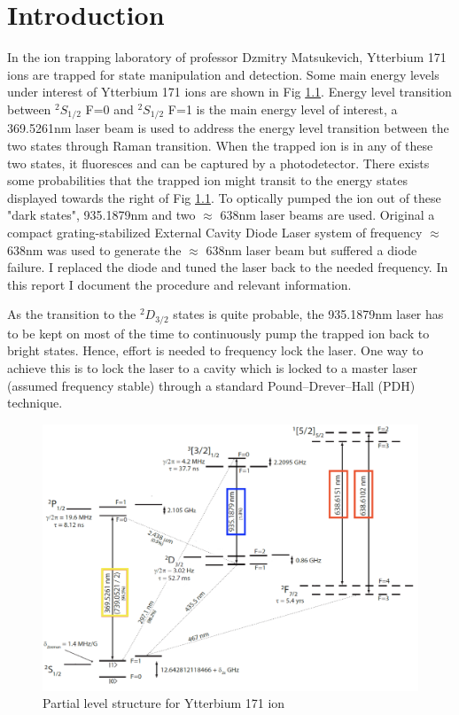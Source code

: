 \documentclass[12pt]{report}
\begin{document}
\chapter{Introduction}
In the ion trapping laboratory of professor Dzmitry Matsukevich, Ytterbium 171 ions are trapped for state manipulation and detection. Some main energy levels under interest of Ytterbium 171 ions are shown in Fig \ref{fig:Yitterbium171Ion}. Energy level transition between  $^2 S_{1/2}$ F=0 and $^2 S_{1/2}$ F=1 is the main energy level of interest, a 369.5261nm laser beam is used to address the energy level transition between the two states through Raman transition. When the trapped ion is in any of these two states, it fluoresces and can be captured by a photodetector. There exists some probabilities that the trapped ion might transit to the energy states displayed towards the right of Fig \ref{fig:Yitterbium171Ion}. To optically pumped the ion out of these "dark states", 935.1879nm and two $\approx$ 638nm laser beams are used. Original a compact grating-stabilized External Cavity Diode Laser system of frequency $\approx$ 638nm was used to generate the $\approx$ 638nm laser beam but suffered a diode failure. I replaced the diode and tuned the laser back to the needed frequency. In this report I document the procedure and relevant information. 
\\
\par
As the transition to the $^2 D_{3/2}$ states is quite probable, the 935.1879nm laser has to be kept on most of the time to continuously pump the trapped ion back to bright states. Hence, effort is needed to frequency lock the laser. One way to achieve this is to lock the laser to a cavity which is locked to a master laser (assumed frequency stable) through a standard Pound–Drever–Hall (PDH) technique. 

\begin{figure}[H]
    \centering
    \includegraphics[width=\textwidth]{Yitterbium171Ion.png}
    \caption{Partial level structure for Ytterbium 171 ion \cite{DemonstrationOfRabi-FlopsWithYtterbium171Trapped-IonQubits}
    }
    \label{fig:Yitterbium171Ion}
\end{figure}
\end{document}
